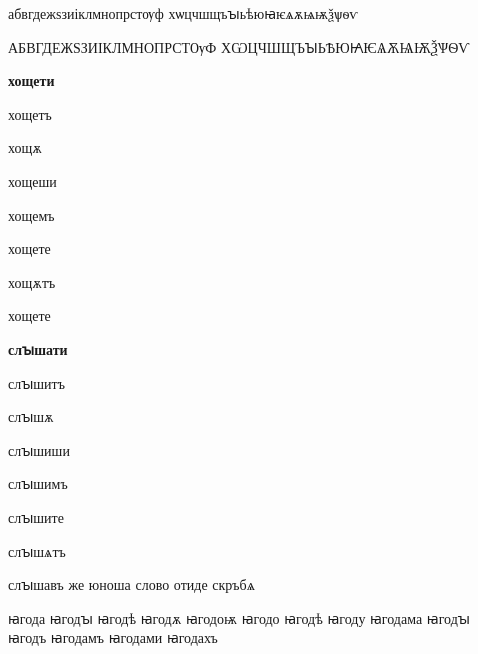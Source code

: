 \documentclass{article}
\begin{document}
	\raggedright
	абвгдежѕзиіклмнопрстѹф%
	хѡцчшщъꙑьѣюꙗѥѧѫѩѭѯѱѳѵ
	
	\uppercase{абвгдежѕзиіклмнопрстѹф
		хѡцчшщъꙑьѣюꙗѥѧѫѩѭѯѱѳѵ}
	
	\textbf{хощети}
	
	хощетъ
	
	хощѫ
	
	хощеши
	
	хощемъ
	
	хощете
	
	хощѫтъ
	
	хощете
	
	
	\textbf{слꙑшати}
	
	слꙑшитъ
	
	слꙑшѫ
	
	слꙑшиши
	
	слꙑшимъ
	
	слꙑшите
	
	слꙑшѧтъ
	
	слꙑшавъ же юноша слово отиде скръбѧ
	
	ꙗгода
	ꙗгодꙑ
	ꙗгодѣ
	ꙗгодѫ
	ꙗгодоѭ
	ꙗгодо
	ꙗгодѣ
	ꙗгоду
	ꙗгодама
	ꙗгодꙑ
	ꙗгодъ
	ꙗгодамъ
	ꙗгодами
	ꙗгодахъ
	
	
\end{document}
